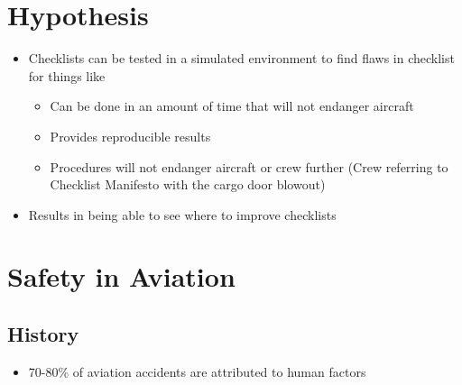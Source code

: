 \documentclass[../dissertation.tex]{subfiles}
\begin{document}
\section{Hypothesis}
\begin{itemize}
    \item Checklists can be tested in a simulated environment 
      to find flaws in checklist for things like
      \begin{itemize}
        \item Can be done in an amount of time that will not endanger aircraft
        \item Provides reproducible results
        \item Procedures will not endanger aircraft or crew further (Crew referring to Checklist Manifesto with the cargo door blowout)
      \end{itemize}
    \item Results in being able to see where to improve checklists
\end{itemize}


\section{Safety in Aviation}
\subsection{History}
\begin{itemize}
  \item 70-80\% of aviation accidents are attributed to human factors~\cite{faa:reasons}
\end{itemize}
\end{document}
